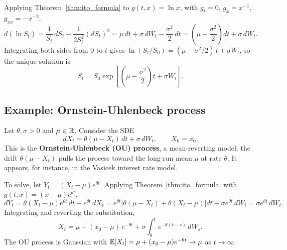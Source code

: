 Applying Theorem~\ref{thm:ito_formula} to $g(t, x) = \ln x$,
with $g_t = 0$, $g_x = x^{-1}$, $g_{xx} = -x^{-2}$,
\begin{equation*}
    d(\ln S_t)
        = \frac{1}{S_t}\, dS_t - \frac{1}{2 S_t^2}(dS_t)^2
        = \mu\, dt + \sigma\, dW_t - \frac{\sigma^2}{2}\, dt
        = \left(\mu - \frac{\sigma^2}{2}\right) dt + \sigma\, dW_t.
\end{equation*}
Integrating both sides from $0$ to $t$ gives $\ln(S_t / S_0) = (\mu - \sigma^2/2)\,t + \sigma W_t$,
so the unique solution is
\begin{equation}\label{eq:gbm_solution}
    S_t = S_0 \exp\!\left[\left(\mu - \frac{\sigma^2}{2}\right) t + \sigma W_t\right].
\end{equation}

\subsection{Example: Ornstein-Uhlenbeck process}

Let $\theta, \sigma > 0$ and $\mu \in \mathbb{R}$.
Consider the SDE
\begin{equation}\label{eq:ou_sde}
    dX_t = \theta(\mu - X_t)\, dt + \sigma\, dW_t, \qquad X_0 = x_0.
\end{equation}
This is the \textbf{Ornstein-Uhlenbeck (OU) process},
a mean-reverting model: the drift $\theta(\mu - X_t)$ pulls the process toward the long-run mean $\mu$ at rate $\theta$.
It appears, for instance, in the Vasicek interest rate model.

To solve, let $Y_t = (X_t - \mu)e^{\theta t}$.
Applying Theorem~\ref{thm:ito_formula} with $g(t,x) = (x - \mu)e^{\theta t}$,
\begin{equation*}
    dY_t
        = \theta(X_t - \mu)e^{\theta t}\, dt + e^{\theta t}\, dX_t
        = e^{\theta t}\bigl[\theta(\mu - X_t) + \theta(X_t - \mu)\bigr] dt + \sigma e^{\theta t}\, dW_t
        = \sigma e^{\theta t}\, dW_t.
\end{equation*}
Integrating and reverting the substitution,
\begin{equation}\label{eq:ou_solution}
    X_t = \mu + (x_0 - \mu)\,e^{-\theta t} + \sigma \int_0^t e^{-\theta(t - s)}\, dW_s.
\end{equation}
The OU process is Gaussian with $\mathbb{E}[X_t] = \mu + (x_0 - \mu)e^{-\theta t} \to \mu$ as $t \to \infty$.




